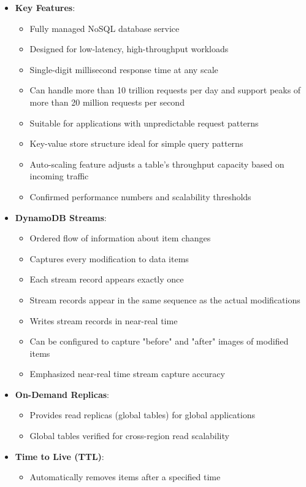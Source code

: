 \documentclass[11pt,a4paper]{report}
\begin{document}
\begin{itemize}
  \item \textbf{Key Features}:
\begin{itemize}
  \item Fully managed NoSQL database service
  \item Designed for low-latency, high-throughput workloads
  \item Single-digit millisecond response time at any scale
  \item Can handle more than 10 trillion requests per day and support peaks of more than 20 million requests per second
  \item Suitable for applications with unpredictable request patterns
  \item Key-value store structure ideal for simple query patterns
  \item Auto-scaling feature adjusts a table's throughput capacity based on incoming traffic
  \item Confirmed performance numbers and scalability thresholds
\end{itemize}
  \item \textbf{DynamoDB Streams}:
\begin{itemize}
  \item Ordered flow of information about item changes
  \item Captures every modification to data items
  \item Each stream record appears exactly once
  \item Stream records appear in the same sequence as the actual modifications
  \item Writes stream records in near-real time
  \item Can be configured to capture "before" and "after" images of modified items
  \item Emphasized near-real time stream capture accuracy
\end{itemize}
  \item \textbf{On-Demand Replicas}:
\begin{itemize}
  \item Provides read replicas (global tables) for global applications
  \item Global tables verified for cross-region read scalability
\end{itemize}
  \item \textbf{Time to Live (TTL)}:
\begin{itemize}
  \item Automatically removes items after a specified time

\end{itemize}
\end{itemize}
\end{document}
